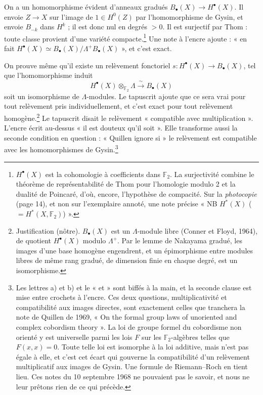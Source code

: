 \documentclass[11pt,a4paper]{article}
\begin{document}
On a un homomorphisme évident d'anneaux gradués $B_\bullet(X) \to
H^{\bullet}(X)$. Il envoie $Z \to X$ sur l'image de $1 \in H^{0}(Z)$ par
l'homomorphisme de Gysin, et envoie $B_{-k}$ dans $H^{k}$ ; il est donc nul en
degrés $> 0$. Il est surjectif par Thom : toute classe provient d'une variété
compacte.\footnote{$H^{\bullet}(X)$ est la cohomologie à coefficients dans
$\mathbb{F}_2$. La surjectivité combine le théorème de représentabilité de Thom
pour l'homologie modulo 2 et la dualité de Poincaré, d'où, encore,
l'hypothèse de compacité. Sur la \emph{photocopie} (page 14), et non sur
l'exemplaire annoté, une note précise « NB $H^{*}(X)$ ($= H^{*}(X,
\mathbb{F}_2)$) ».} Une note à l'encre ajoute : « en fait $H^{\bullet}(X)
\simeq B_\bullet(X)/\Lambda^{+}B_\bullet(X)$ », et c'est exact.

On prouve même qu'il existe un relèvement fonctoriel $s : H^{\bullet}(X) \to
B_\bullet(X)$, tel que l'homomorphisme induit
\[
H^{\bullet}(X) \otimes_{\mathbb{F}_2} \Lambda \xrightarrow{\ \sim\ } B_\bullet(X)
\]
soit un isomorphisme de $\Lambda$-modules. Le tapuscrit ajoute que ce sera
vrai pour tout relèvement pris individuellement, et c'est exact pour tout
relèvement homogène.\footnote{Justification (nôtre). $B_\bullet(X)$ est un
$\Lambda$-module libre (Conner et Floyd, 1964), de quotient $H^{\bullet}(X)$
modulo $\Lambda^{+}$. Par le lemme de Nakayama gradué, les images d'une base
homogène engendrent, et un épimorphisme entre modules libres de même rang
gradué, de dimension finie en chaque degré, est un isomorphisme.} Le
tapuscrit disait le relèvement « compatible avec multiplication ». L'encre
écrit au-dessus « il est douteux qu'il soit ». Elle transforme aussi la seconde
condition en question : « Quillen ignore si » le relèvement est compatible avec
les homomorphismes de Gysin.\footnote{Les lettres a) et b) et le « et » sont
biffés à la main, et la seconde clause est mise entre crochets à l'encre. Ces
deux questions, multiplicativité et compatibilité aux images directes, sont
exactement celles que tranchera la note de Quillen de 1969, « On the formal
group laws of unoriented and complex cobordism theory ». La loi de groupe
formel du cobordisme non orienté y est universelle parmi les lois $F$ sur les
$\mathbb{F}_2$-algèbres telles que $F(x,x) = 0$. Toute telle loi est isomorphe
à la loi additive, mais n'est pas égale à elle, et c'est cet écart qui
gouverne la compatibilité d'un relèvement multiplicatif aux images de Gysin.
Une formule de Riemann--Roch en tient lieu. Ces notes du 10 septembre 1968 ne
pouvaient pas le savoir, et nous ne leur prêtons rien de ce qui précède.}
\end{document}
